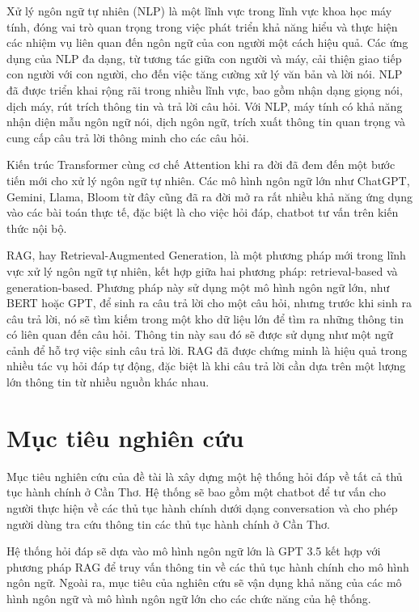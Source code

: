 \documentclass[a4paper, 12pt, openany]{book}
\begin{document}
Xử lý ngôn ngữ tự nhiên (NLP) là một lĩnh vực trong lĩnh vực khoa học máy tính, đóng vai trò quan trọng trong việc phát triển khả năng hiểu và thực hiện các nhiệm vụ liên quan đến ngôn ngữ của con người một cách hiệu quả. Các ứng dụng của NLP đa dạng, từ tương tác giữa con người và máy, cải thiện giao tiếp con người với con người, cho đến việc tăng cường xử lý văn bản và lời nói. NLP đã được triển khai rộng rãi trong nhiều lĩnh vực, bao gồm nhận dạng giọng nói, dịch máy, rút trích thông tin và trả lời câu hỏi. Với NLP, máy tính có khả năng nhận diện mẫu ngôn ngữ nói, dịch ngôn ngữ, trích xuất thông tin quan trọng và cung cấp câu trả lời thông minh cho các câu hỏi.

Kiến trúc Transformer cùng cơ chế Attention khi ra đời đã đem đến một bước tiến mới cho
xử lý ngôn ngữ tự nhiên. Các mô hình ngôn ngữ lớn như ChatGPT, Gemini, Llama, Bloom từ đây cũng đã ra đời mở ra rất nhiều khả năng ứng dụng vào các bài toán thực tế,
đặc biệt là cho việc hỏi đáp, chatbot tư vấn trên kiến thức nội bộ.

RAG, hay Retrieval-Augmented Generation, là một phương pháp mới trong lĩnh vực xử lý ngôn ngữ tự nhiên, kết hợp giữa hai phương pháp: retrieval-based và generation-based. 
Phương pháp này sử dụng một mô hình ngôn ngữ lớn, như BERT hoặc GPT, để sinh ra câu trả lời cho một câu hỏi, nhưng trước khi sinh ra câu trả lời, nó sẽ tìm kiếm trong một kho dữ liệu lớn để tìm ra những thông tin có liên quan đến câu hỏi. Thông tin này sau đó sẽ được sử dụng như một ngữ cảnh để hỗ trợ việc sinh câu trả lời.
RAG đã được chứng minh là hiệu quả trong nhiều tác vụ hỏi đáp tự động, đặc biệt là khi câu trả lời cần dựa trên một lượng lớn thông tin từ nhiều nguồn khác nhau. 

\section{Mục tiêu nghiên cứu}

Mục tiêu nghiên cứu của đề tài là xây dựng một hệ thống hỏi đáp về tất cả thủ tục hành chính ở Cần Thơ.
Hệ thống sẽ bao gồm một chatbot để tư vấn cho người thực hiện về các thủ tục hành chính dưới dạng conversation và cho 
phép người dùng tra cứu thông tin các thủ tục hành chính ở Cần Thơ.

Hệ thống hỏi đáp sẽ dựa vào mô hình ngôn ngữ lớn là GPT 3.5 kết hợp với phương pháp RAG
để truy vấn thông tin về các thủ tục hành chính cho mô hình ngôn ngữ. Ngoài ra, mục tiêu của nghiên cứu sẽ 
vận dụng khả năng của các mô hình ngôn ngữ và mô hình ngôn ngữ lớn cho các chức năng của hệ thống.
\end{document}
